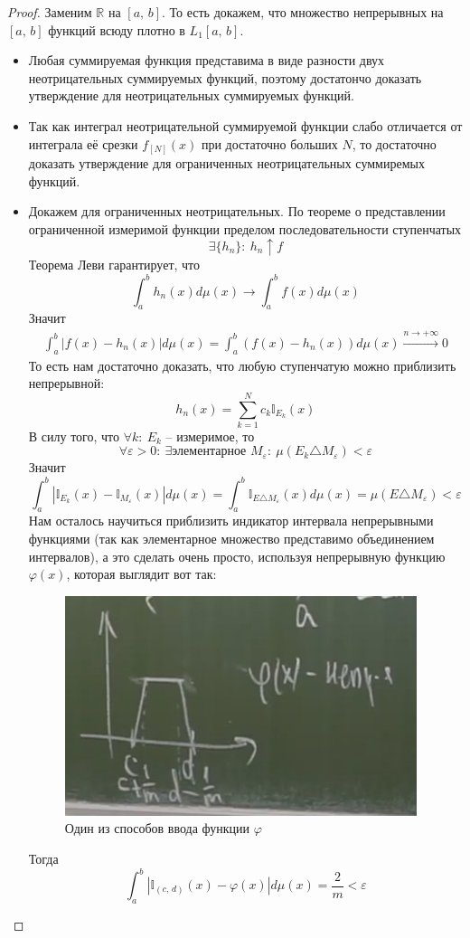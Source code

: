 \documentclass[a4paper,12pt]{article}
\renewcommand{\phi}{\ensuremath{\varphi}}
\theoremstyle{plain}
\theoremstyle{definition}
\theoremstyle{remark}
\begin{document}
\begin{proof}
	Заменим $\mathbb{R}$ на $[a,\,b]$. То есть докажем, что множество непрерывных на $[a,\,b]$ функций всюду плотно в $L_1[a,\,b]$.

	\begin{itemize}
		\item Любая суммируемая функция представима в виде разности двух неотрицательных суммируемых функций, поэтому достатончо доказать утверждение для
		      неотрицательных суммируемых функций.
		\item Так как интеграл неотрицательной суммируемой функции слабо отличается от интеграла её срезки $f_{[N]}(x)$ при достаточно больших $N$, то
		      достаточно доказать утверждение для ограниченных неотрицательных суммиремых функций.
		\item Докажем для ограниченных неотрицательных. По теореме о представлении ограниченной измеримой функции пределом последовательности ступенчатых
		      \[\exists \{h_n\}:\: h_n \uparrow f\]
		      Теорема Леви гарантирует, что
		      \[\int_a^b h_n(x)d\mu(x) \to \int_a^b f(x)d\mu(x)\]
		      Значит
		      \begin{align*}
			      \int_a^b |f(x) - h_n(x)|d\mu(x) = \int_a^b (f(x) - h_n(x))d\mu(x) \stackrel{n \to +\infty}{\to} 0
		      \end{align*}
		      То есть нам достаточно доказать, что любую ступенчатую можно приблизить непрерывной:
		      \[h_n(x) = \sum_{k = 1}^N c_k \mathbb{I}_{E_k}(x)\]
		      В силу того, что $\forall k:\: E_k$ -- измеримое, то
		      \[\forall \varepsilon > 0:\: \exists \text{элементарное } M_\varepsilon:\: \mu(E_k \triangle M_\varepsilon) < \varepsilon \]
		      Значит
		      \[\int_a^b |\mathbb{I}_{E_k}(x) - \mathbb{I}_{M_\varepsilon}(x)|d\mu(x) = \int_a^b \mathbb{I}_{E \triangle M_\varepsilon}(x)d\mu(x) = \mu(E \triangle M_\varepsilon) < \varepsilon\]
		      Нам осталось научиться приблизить индикатор интервала непрерывными функциями (так как элементарное множество представимо объединением интервалов), а это сделать очень просто, используя непрерывную функцию $\phi(x)$, которая выглядит вот так:
		      \begin{figure}[h]
			      \includegraphics[scale=0.5]{img/phi_graph.png}
			      \caption{Один из способов ввода функции $\phi$}
		      \end{figure}
		      Тогда
		      \[\int_a^b |\mathbb{I}_{(c,\,d)}(x) - \phi(x)|d\mu(x) = \frac{2}{m} < \varepsilon\]
	\end{itemize}


\end{proof}
\end{document}

